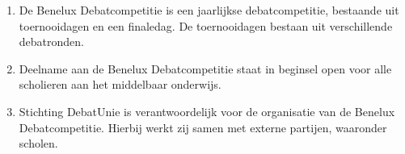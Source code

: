 
\begin{enumerate}
\item De Benelux Debatcompetitie is een jaarlijkse debatcompetitie, bestaande uit toernooidagen en een finaledag. De toernooidagen bestaan uit verschillende debatronden.
\item Deelname aan de Benelux Debatcompetitie staat in beginsel open voor alle scholieren aan het middelbaar onderwijs.
\item Stichting DebatUnie is verantwoordelijk voor de organisatie van de Benelux Debatcompetitie. Hierbij werkt zij samen met externe partijen, waaronder scholen.
\end{enumerate}